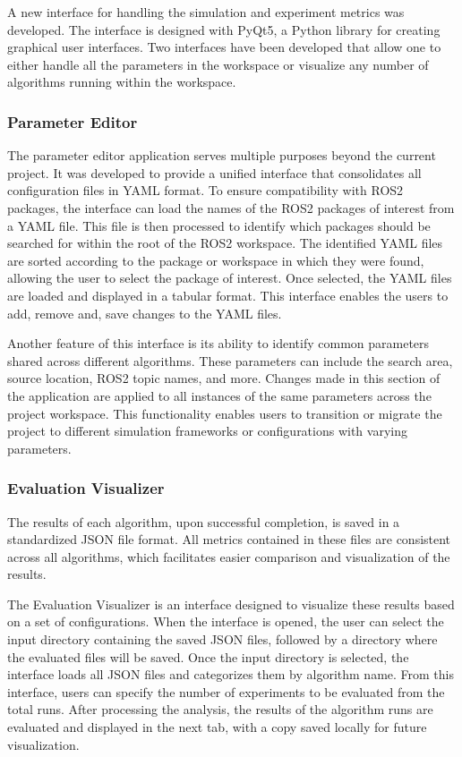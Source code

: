 \documentclass[../report.tex]{subfiles}
\begin{document}
    A new interface for handling the simulation and experiment metrics was developed. The interface is designed with PyQt5, a Python library for creating graphical user interfaces. 
    Two interfaces have been developed that allow one to either handle all the parameters in the workspace or visualize any number of algorithms running within the workspace.
        
    \subsubsection{Parameter Editor}
    The parameter editor application serves multiple purposes beyond the current project. It was developed to provide a unified interface that consolidates all configuration files in YAML format. 
    To ensure compatibility with ROS2 packages, the interface can load the names of the ROS2 packages of interest from a YAML file. This file is then processed to identify which packages should be
     searched for within the root of the ROS2 workspace. The identified YAML files are sorted according to the package or workspace in which they were found, allowing the user to select the 
     package of interest. Once selected, the YAML files are loaded and displayed in a tabular format. This interface enables the users to add, remove and, save changes to the YAML files.  

    Another feature of this interface is its ability to identify common parameters shared across different algorithms. These parameters can include the search area, source location, ROS2 
    topic names, and more. Changes made in this section of the application are applied to all instances of the same parameters across the project workspace. This functionality enables users 
    to transition or migrate the project to different simulation frameworks or configurations with varying parameters.

    \subsubsection{Evaluation Visualizer}

    The results of each algorithm, upon successful completion, is saved in a standardized JSON file format. All metrics contained in these files are consistent across all algorithms, which facilitates easier 
    comparison and visualization of the results.

    The Evaluation Visualizer is an interface designed to visualize these results based on a set of configurations. When the interface is opened, the user can select the input directory containing 
    the saved JSON files, followed by a directory where the evaluated files will be saved. Once the input directory is selected, the interface loads all JSON files and categorizes them by algorithm
    name. From this interface, users can specify the number of experiments to be evaluated from the total runs. After processing the analysis, the results of the algorithm runs are evaluated and 
    displayed in the next tab, with a copy saved locally for future visualization.
\end{document}
